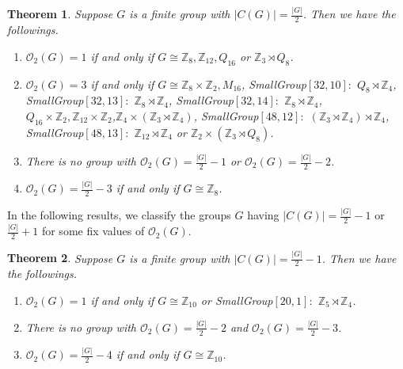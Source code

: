\documentclass[a4paper,11pt]{amsart}
\numberwithin{equation}{section}
\numberwithin{equation}{subsection}
\newtheorem{theorem}{Theorem}[section]
\begin{document}
\begin{theorem}\label{mainresult_2}
Suppose $G$ is a finite group with $|C(G)|=\frac{|G|}{2}$. Then we have the followings. 
\begin{enumerate}
      \item $\mathcal{O}_{2}(G)=1$ if and only if $G\cong \mathbb Z_8, \mathbb Z_{12}, Q_{16}$ or $ \mathbb{Z}_{3}\rtimes Q_8$.
        
\item $\mathcal{O}_{2}(G)=3$ if and only if $G\cong \mathbb Z_8 \times \mathbb Z_2, M_{16}$, SmallGroup$[32,10]:$ $ Q_8 \rtimes \mathbb Z_4$, SmallGroup$[32,13]:$ $\mathbb Z_8 \rtimes \mathbb Z_4 $, SmallGroup$[32,14]:$ $\mathbb Z_8 \rtimes \mathbb Z_4$, $Q_{16}\times \mathbb{Z}_2, \mathbb Z_{12}\times \mathbb Z_2$,$ \mathbb Z_4\times (\mathbb{Z}_{3} \rtimes \mathbb{Z}_{4})$, SmallGroup$[48,12]:$ $(\mathbb{Z}_{3} \rtimes \mathbb{Z}_{4})\rtimes \mathbb{Z}_4$, SmallGroup$[48,13]:$ $\mathbb{Z}_{12}\rtimes \mathbb{Z}_4$ or $\mathbb{Z}_2\times (\mathbb{Z}_{3}\rtimes Q_{8})$.

        

        \item There is no group with $\mathcal{O}_{2}(G)=\frac{|G|}{2}-1$ or $\mathcal{O}_{2}(G)=\frac{|G|}{2}-2$.
        
        
                \item $\mathcal{O}_{2}(G)=\frac{|G|}{2}-3$ if and only if $G\cong \mathbb Z_8$.

\end{enumerate}
\end{theorem}
In the following results, we classify the groups $G$ having $|C(G)|=\frac{|G|}{2}-1$ or $ \frac{|G|}{2}+1$ for some fix values of $\mathcal{O}_{2}(G)$.
 \begin{theorem}\label{mainresult_3}
Suppose $G$ is a finite group with $|C(G)|=\frac{|G|}{2}-1$. Then we have the followings.   
\begin{enumerate} 
        \item $\mathcal{O}_{2}(G)=1$ if and only if $G\cong \mathbb Z_{10} $ or SmallGroup$[20,1]:$ $\mathbb{Z}_{5}\rtimes \mathbb{Z}_{4}$.
        

        \item There is no group with $\mathcal{O}_{2}(G)=\frac{|G|}{2}-2$ and $\mathcal{O}_{2}(G)=\frac{|G|}{2}-3$.
        
        \item $\mathcal{O}_{2}(G)=\frac{|G|}{2}-4$ if and only if $G\cong \mathbb Z_{10}$.

         
    \end{enumerate}
\end{theorem}
\end{document}
